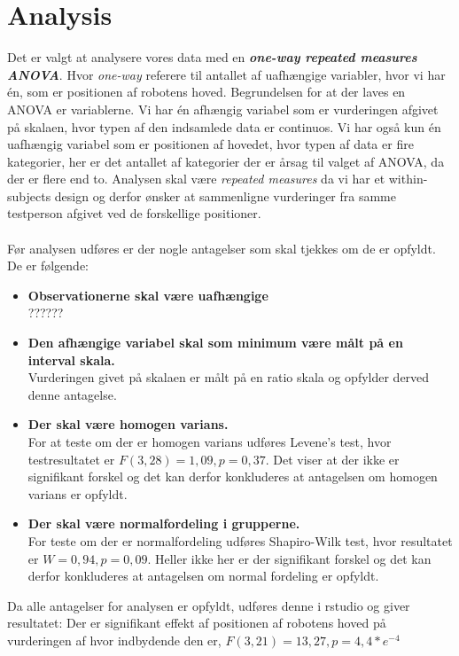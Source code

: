 \section*{Analysis}
\label{analysis}

Det er valgt at analysere vores data med en \textbf{\textit{one-way repeated measures ANOVA}}. Hvor \textit{one-way} referere til antallet af uafhængige variabler, hvor vi har én, som er positionen af robotens hoved. 
Begrundelsen for at der laves en ANOVA er variablerne. Vi har én afhængig variabel som er vurderingen afgivet på skalaen, hvor typen af den indsamlede data er continuos. Vi har også kun én uafhængig variabel som er positionen af hovedet, hvor typen af data er fire kategorier, her er det antallet af kategorier der er årsag til valget af ANOVA, da der er flere end to. 
Analysen skal være \textit{repeated measures} da vi har et within-subjects design og derfor ønsker at sammenligne vurderinger fra samme testperson afgivet ved de forskellige positioner. 
\\\\
Før analysen udføres er der nogle antagelser som skal tjekkes om de er opfyldt. De er følgende: 
\begin{itemize}
	\item \textbf{Observationerne skal være uafhængige}\\
	?????? 
	\item \textbf{Den afhængige variabel skal som minimum være målt på en interval skala.}\\
	Vurderingen givet på skalaen er målt på en ratio skala og opfylder derved denne antagelse.
	\item \textbf{Der skal være homogen varians. }\\
	For at teste om der er homogen varians udføres Levene's test, hvor testresultatet er $F(3,28)=1,09, p=0,37$. Det viser at der ikke er signifikant forskel og det kan derfor konkluderes at antagelsen om homogen varians er opfyldt. 
	\item \textbf{Der skal være normalfordeling i grupperne.}\\
	For teste om der er normalfordeling udføres Shapiro-Wilk test, hvor resultatet er $W=0,94, p=0,09$. Heller ikke her er der signifikant forskel og det kan derfor konkluderes at antagelsen om normal fordeling er opfyldt.
\end{itemize}

\noindent Da alle antagelser for analysen er opfyldt, udføres denne i rstudio og giver resultatet: 
Der er signifikant effekt af positionen af robotens hoved på vurderingen af hvor indbydende den er, $F(3,21)=13,27, p=4,4*e^{-4}$

